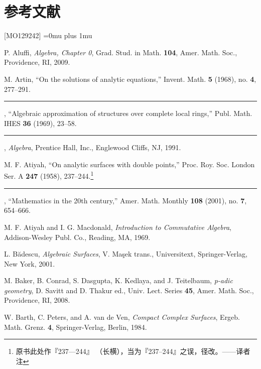
\chapter*{参考文献}
{}

\begingroup
\def\chapter*#1{}%
\newcommand{\sameauthor}{\rule[-1pt]{1.5em}{0.4pt}}%
\begin{thebibliography}{[MO129242]}
\sloppy\Urlmuskip=0mu plus 1mu\relax%
  \hfuzz=20pt \vfuzz=5pt%

P. Aluffi, \emph{Algebra, Chapter 0}, Grad. Stud. in Math. \textbf{104}, Amer.
Math. Soc., Providence, RI, 2009.

M. Artin, ``On the solutions of analytic equations,'' Invent. Math. \textbf{5}
(1968), no. \textbf{4}, 277--291.

\sameauthor, ``Algebraic approximation of structures over complete local
rings,'' Publ. Math. IHES \textbf{36} (1969), 23--58.

\sameauthor, \emph{Algebra}, Prentice Hall, Inc., Englewood Cliffs, NJ, 1991.

M. F. Atiyah, ``On analytic surfaces with double points,'' Proc. Roy. Soc.
London Ser. A \textbf{247} (1958), 237--244.\footnote{原书此处作『237—244』
（长横），当为『237--244』之误，径改。——译者注}

\sameauthor, ``Mathematics in the 20th century,'' Amer. Math. Monthly
\textbf{108} (2001), no. \textbf{7}, 654--666.

M. F. Atiyah and I. G. Macdonald, \emph{Introduction to Commutative Algebra},
Addison-Wesley Publ. Co., Reading, MA, 1969.

L. Bădescu, \emph{Algebraic Surfaces}, V. Maşek trans., Universitext,
Springer-Verlag, New York, 2001.

M. Baker, B. Conrad, S. Dasgupta, K. Kedlaya, and J. Teitelbaum, \emph{p-adic
geometry}, D. Savitt and D. Thakur ed., Univ. Lect. Series \textbf{45}, Amer.
Math. Soc., Providence, RI, 2008.

W. Barth, C. Peters, and A. van de Ven, \emph{Compact Complex Surfaces},
Ergeb. Math. Grenz. \textbf{4}, Springer-Verlag, Berlin, 1984.


\end{thebibliography}
